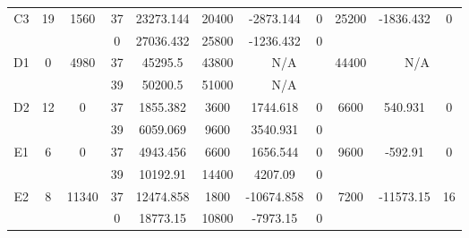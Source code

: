 \begin{sidewaystable}
\begin{tabular}{c||c|c||c|c|c|c|c||c|c|c}
         &
        
      \\
      \hline
      \multirow{2}{*}{C3} &
      \multirow{2}{*}{19} &
      \multirow{2}{*}{1560} &
      37 &
      23273.144 &
      20400 &
        -2873.144 &
        0 &
      \multirow{2}{*}{25200} &
        \multirow{2}{*}{-1836.432} &
        \multirow{2}{*}{0}
      \\
      \cline{4-8}
       &
       &
       &
      0 &
      27036.432 &
      25800 &
        -1236.432 &
        0 &
      
         &
        
      \\
      \hline
      \multirow{2}{*}{D1} &
      \multirow{2}{*}{0} &
      \multirow{2}{*}{4980} &
      37 &
      45295.5 &
      43800 &
        \multicolumn{2}{|c||}{N/A} &
      \multirow{2}{*}{44400} &
        \multicolumn{2}{c}{\multirow{2}{*}{N/A}}
      \\
      \cline{4-8}
       &
       &
       &
      39 &
      50200.5 &
      51000 &
        \multicolumn{2}{|c||}{N/A} &
      
        
      \\
      \hline
      \multirow{2}{*}{D2} &
      \multirow{2}{*}{12} &
      \multirow{2}{*}{0} &
      37 &
      1855.382 &
      3600 &
        1744.618 &
        0 &
      \multirow{2}{*}{6600} &
        \multirow{2}{*}{540.931} &
        \multirow{2}{*}{0}
      \\
      \cline{4-8}
       &
       &
       &
      39 &
      6059.069 &
      9600 &
        3540.931 &
        0 &
      
         &
        
      \\
      \hline
      \multirow{2}{*}{E1} &
      \multirow{2}{*}{6} &
      \multirow{2}{*}{0} &
      37 &
      4943.456 &
      6600 &
        1656.544 &
        0 &
      \multirow{2}{*}{9600} &
        \multirow{2}{*}{-592.91} &
        \multirow{2}{*}{0}
      \\
      \cline{4-8}
       &
       &
       &
      39 &
      10192.91 &
      14400 &
        4207.09 &
        0 &
      
         &
        
      \\
      \hline
      \multirow{2}{*}{E2} &
      \multirow{2}{*}{8} &
      \multirow{2}{*}{11340} &
      37 &
      12474.858 &
      1800 &
        -10674.858 &
        0 &
      \multirow{2}{*}{7200} &
        \multirow{2}{*}{-11573.15} &
        \multirow{2}{*}{16}
      \\
      \cline{4-8}
       &
       &
       &
      0 &
      18773.15 &
      10800 &
        -7973.15 &
        0 &
      

\end{tabular}
\end{sidewaystable}
